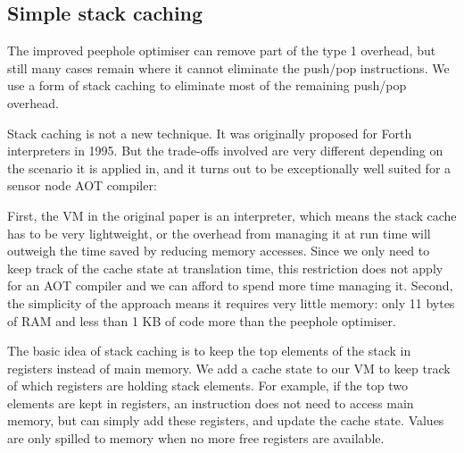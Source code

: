 
\subsection{Simple stack caching}
\label{sec-optimisations-simple-stack-caching}


The improved peephole optimiser can remove part of the type 1 overhead, but still many cases remain where it cannot eliminate the push/pop instructions. We use a form of stack caching \cite{Ertl:1995dv} to eliminate most of the remaining push/pop overhead.

Stack caching is not a new technique. It was originally proposed for Forth interpreters in 1995. But the trade-offs involved are very different depending on the scenario it is applied in, and it turns out to be exceptionally well suited for a sensor node AOT compiler:

First, the VM in the original paper is an interpreter, which means the stack cache has to be very lightweight, or the overhead from managing it at run time will outweigh the time saved by reducing memory accesses. Since we only need to keep track of the cache state at translation time, this restriction does not apply for an AOT compiler and we can afford to spend more time managing it. Second, the simplicity of the approach means it requires very little memory: only 11 bytes of RAM and less than 1 KB of code more than the peephole optimiser.

The basic idea of stack caching is to keep the top elements of the stack in registers instead of main memory. We add a cache state to our VM to keep track of which registers are holding stack elements. For example, if the top two elements are kept in registers, an  instruction does not need to access main memory, but can simply add these registers, and update the cache state. Values are only spilled to memory when no more free registers are available.

